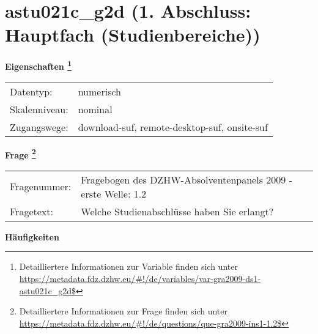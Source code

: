 
    \setcounter{footnote}{0}

    \vspace*{-1.8cm}
	\section{astu021c\_g2d (1. Abschluss: Hauptfach (Studienbereiche))}
	\label{section:astu021c_g2d}



    \vspace*{0.5cm}
    \noindent\textbf{Eigenschaften
	\footnote{Detailliertere Informationen zur Variable finden sich unter
		\url{https://metadata.fdz.dzhw.eu/\#!/de/variables/var-gra2009-ds1-astu021c_g2d$}}}\\
	\begin{tabularx}{\hsize}{@{}lX}
	Datentyp: & numerisch \\
	Skalenniveau: & nominal \\
	Zugangswege: &
	  download-suf, 
	  remote-desktop-suf, 
	  onsite-suf
 \\
    \end{tabularx}



				\vspace*{0.5cm}
                \noindent\textbf{Frage
	                \footnote{Detailliertere Informationen zur Frage finden sich unter
		              \url{https://metadata.fdz.dzhw.eu/\#!/de/questions/que-gra2009-ins1-1.2$}}}\\
				\begin{tabularx}{\hsize}{@{}lX}
					Fragenummer: &
					  Fragebogen des DZHW-Absolventenpanels 2009 - erste Welle:
					  1.2
 \\
					Fragetext: & Welche Studienabschlüsse haben Sie erlangt? \\
				\end{tabularx}





        		\vspace*{0.5cm}
                \noindent\textbf{Häufigkeiten}

